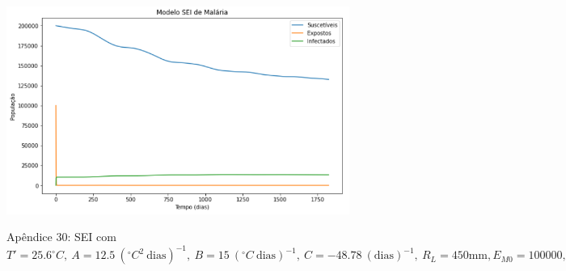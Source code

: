 \documentclass[12pt]{article}
\begin{document}
\begin{figure}[!ht]
        \centering
        \hbox{\hspace{2.5em} \includegraphics[scale=0.7] {SEI_Entrada_Pop_100000_1000_Infect.png}}
        \caption*{Apêndice 30: SEI com $T'=25.6^\circ C, \ A=12.5 \ (^\circ C^2 \ \text{dias})^{-1}, \ B=15 \ (^\circ C \ \text{dias})^{-1}, \ C=-48.78 \ (\text{dias})^{-1}, \ R_L=450 \text{mm}, E_{M0}=100000, I_{H0}=1000$} 
\end{figure} 





\end{document}
